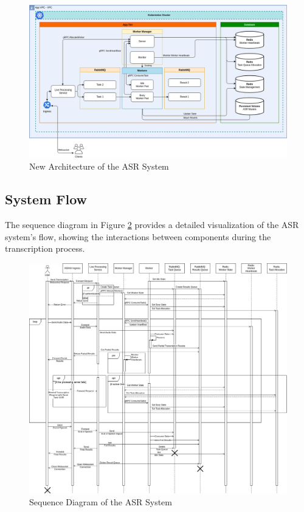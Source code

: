 \begin{figure}[!h]
    \centering
    \includegraphics[width=\textwidth]{figures/new_architecture.drawio.png}
    \caption{New Architecture of the ASR System}
    \label{fig:new_architecture}
\end{figure}

\subsection{System Flow}
The sequence diagram in Figure \ref{fig:sequence_diagram} provides a detailed visualization of the ASR system's flow, showing the interactions between components during the transcription process.

\clearpage

\begin{figure}[ht]
    \centering
    \includegraphics[width=\textwidth]{figures/sequence_diagram.drawio.png}
    \caption{Sequence Diagram of the ASR System}
    \label{fig:sequence_diagram}
\end{figure}

